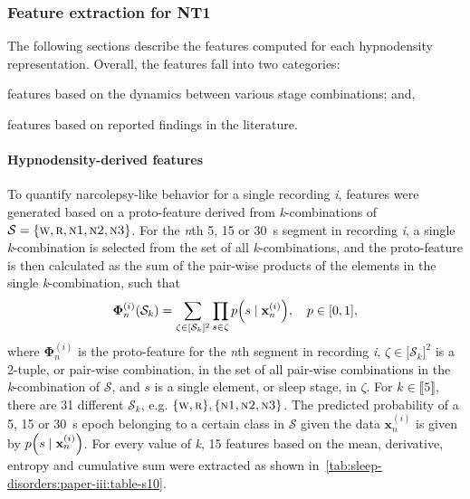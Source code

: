 \subsubsection{Feature extraction for \ac{NT1}}

The following sections describe the features computed for each hypnodensity representation.
Overall, the features fall into two categories:
\begin{enumerate*}[label={(\roman*)}]
\item features based on the dynamics between various stage combinations; and,
\item features based on reported findings in the literature.
\end{enumerate*}

\paragraph{Hypnodensity-derived features}
To quantify narcolepsy-like behavior for a single recording \textit{i}, features were generated based on a proto-feature derived from \textit{k}-combinations of $\mathcal{S} = \lbrace \textsc{w}, \textsc{r}, \textsc{n1}, \textsc{n2}, \textsc{n3} \rbrace$. 
For the \textit{n}th \num{5}, \num{15} or \SI{30}{\second} segment in recording \textit{i}, a single \textit{k}-combination is selected from the set of all \textit{k}-combinations, and the proto-feature is then calculated as the sum of the pair-wise products of the elements in the single \textit{k}-combination, such that
\begin{equation}
    \func{\boldsymbol{\Phi}^{(i)}_{n}}{\mathcal{S}_{k}} = \sum_{\zeta \in \lbrack \mathcal{S}_{k} \rbrack^2} \prod_{s \in \zeta}{\func{p}{ s \mid \mathbf{x}_{n}^{(i)} }}, \quad p \in \lbrack 0,1 \rbrack,
\end{equation}
where $\boldsymbol{\Phi}^{(i)}_{n}$ is the proto-feature for the \textit{n}th segment in recording \textit{i}, $\zeta \in \lbrack \mathcal{S}_{k} \rbrack^2$ is a 2-tuple, or pair-wise combination, in the set of all pair-wise combinations in the \textit{k}-combination of $\mathcal{S}$, and $s$ is a single element, or sleep stage, in $\zeta$.
For $k \in \llbracket 5 \rrbracket$, there are 31 different $\mathcal{S}_k$, e.g. $\lbrace \textsc{w}, \textsc{r} \rbrace, \lbrace \textsc{n1}, \textsc{n2}, \textsc{n3} \rbrace$.
The predicted probability of a 5, 15 or \SI{30}{\second} epoch belonging to a certain class in $\mathcal{S}$ given the data $\mathbf{x}^{(i)}_n$ is given by \( \func{p}{s \mid \mathbf{x}_{n}^{(i)} } \).
For every value of \textit{k}, 15 features based on the mean, derivative, entropy and cumulative sum were extracted as shown in~\cref{tab:sleep-disorders:paper-iii:table-s10}.


